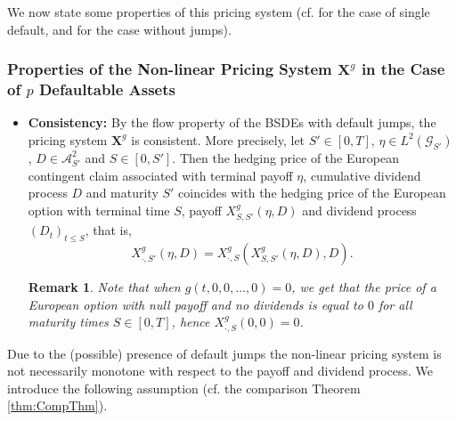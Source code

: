 \documentclass[11pt,a4paper]{article}
\numberwithin{equation}{section}
\theoremstyle{newPlain}
\theoremstyle{newDefinition}
\theoremstyle{newRemark}
\newtheorem{remark}[theorem]{Remark}
\begin{document}
We now state some properties of this  pricing system (cf.  \cite{dumitrescu2018bsdes} for the case of single default, and  \cite{el1997non} for the case without jumps).

 \subsubsection{\texorpdfstring{Properties of the Non-linear Pricing System  $\mathbf{X}^g$  in the Case of $p$ Defaultable Assets}{Properties of the Non-linear Pricing System Xg in the Case of p Defaultable Assets}}\label{subsec:PropertiesofPricingSystem}

 \begin{itemize}
     \item \textbf{Consistency:} By the flow property of the BSDEs with default jumps, the pricing system $\mathbf{X}^g$ is consistent. More precisely, let  $S'\in[0,T]$, $\eta\in L^2(\mathcal{G}_{S'})$, $D\in\mathcal{A}_{S'}^2$ and $S\in[0,S']$. Then the hedging price of the European contingent claim associated with terminal payoff $\eta$, cumulative dividend process $D$ and maturity $S'$ coincides with the hedging price of the European option with terminal time $S$, payoff $X_{S,S'}^g(\eta,D)$ and dividend process $(D_t)_{t\le S}$, that is,
     \begin{equation*}
         X_{\cdot, S'}^g(\eta,D) = X_{\cdot,S}^g\left(X_{S,S'}^g(\eta,D),D\right).
     \end{equation*}
     \begin{remark}\label{remark:3_g00}
         Note that when $g(t,0,0,\ldots,0)=0$, we get that the price of a European option with null payoff and no dividends is equal to $0$ for all maturity times $S\in[0,T]$, hence $X_{\cdot,S}^g(0,0)=0$.
     \end{remark}
 \end{itemize}

Due to the (possible) presence of default jumps the non-linear pricing system is not necessarily monotone with respect to the payoff and dividend process. We introduce the following assumption (cf.  the comparison Theorem \ref{thm:CompThm}).
\end{document}
